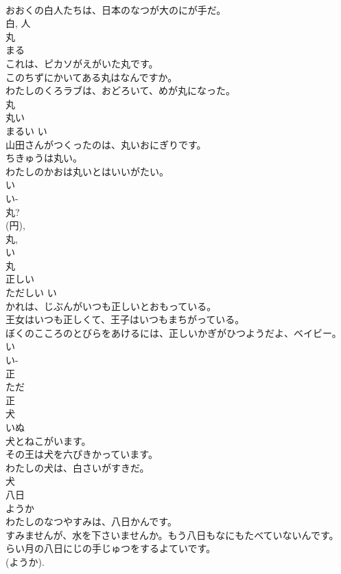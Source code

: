 \documentclass[8pt]{extreport}
\begin{document}
\begin{CJK}{UTF8}{min}
\\	おおくの白人たちは、日本のなつが大のにが手だ。	
\\	白, 人	
\\	丸	
\\	まる	
\\	これは、ピカソがえがいた丸です。	
\\	このちずにかいてある丸はなんですか。	
\\	わたしのくろラブは、おどろいて、めが丸になった。	
\\	丸	
\\	丸い	
\\	まるい	い 
\\	山田さんがつくったのは、丸いおにぎりです。	
\\	ちきゅうは丸い。	
\\	わたしのかおは丸いとはいいがたい。	
\\	い 
\\	い-
\\	丸? 
\\	(円), 
\\	丸, 
\\	い 
\\	丸	
\\	正しい	
\\	ただしい	い 
\\	かれは、じぶんがいつも正しいとおもっている。	
\\	王女はいつも正しくて、王子はいつもまちがっている。	
\\	ぼくのこころのとびらをあけるには、正しいかぎがひつようだよ、ベイビー。	
\\	い 
\\	い-
\\	正 
\\	ただ 
\\	正	
\\	犬	
\\	いぬ	
\\	犬とねこがいます。	
\\	その王は犬を六ぴきかっています。	
\\	わたしの犬は、白さいがすきだ。	
\\	犬	
\\	八日	
\\	ようか	
\\	わたしのなつやすみは、八日かんです。	
\\	すみませんが、水を下さいませんか。もう八日もなにもたべていないんです。	
\\	らい月の八日にじの手じゅつをするよていです。	
\\	(ようか). 

\end{CJK}
\end{document}
